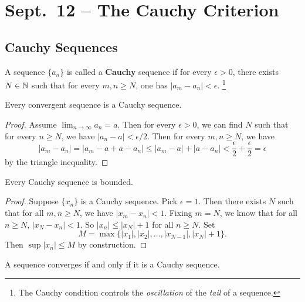 \chapter{Sept.~12 -- The Cauchy Criterion}

\section{Cauchy Sequences}
\begin{definition}
  A sequence $\{a_n\}$ is called a \textbf{Cauchy}
  sequence if for every $\epsilon > 0$, there exists
  $N \in \mathbb{N}$ such that for every $m, n \ge N$,
  one has $|a_m - a_n| < \epsilon$.
  \footnote{The Cauchy condition controls the
    \textit{oscillation} of the \textit{tail} of a sequence.}
\end{definition}

\begin{theorem}
  \label{thm:cauchy-convergent}
  Every convergent sequence is a Cauchy sequence.
\end{theorem}

\begin{proof}
  Assume $\lim_{n \to \infty} a_n = a$. Then for every
  $\epsilon > 0$, we can find $N$ such that for
  every $n \ge N$, we have $|a_n - a| < \epsilon/2$.
  Then for every $m, n \ge N$, we have
  \[
  |a_m - a_n| = |a_m - a + a - a_n| \le
  |a_m - a| + |a - a_n| <
  \frac{\epsilon}{2} + \frac{\epsilon}{2} = \epsilon
  \]
  by the triangle inequality.
\end{proof}

\begin{lemma}
  Every Cauchy sequence is bounded.
\end{lemma}

\begin{proof}
  Suppose $\{x_n\}$ is a Cauchy sequence.
  Pick $\epsilon = 1$. Then there exists $N$ such that
  for all $m, n \ge N$, we have $|x_m - x_n| < 1$.
  Fixing $m = N$, we know that for all $n \ge N$,
  $|x_N - x_n| < 1$. So $|x_n| \le |x_N| + 1$ for all
  $n \ge N$. Set
  \[
    M = \max\{|x_1|, |x_2|, \dots, |x_{N-1}|, |x_N| + 1\}
  .\]
  Then $\sup |x_n| \le M$ by construction.
\end{proof}

\begin{theorem}
  A sequence converges if and only if it is a Cauchy
  sequence.
\end{theorem}

